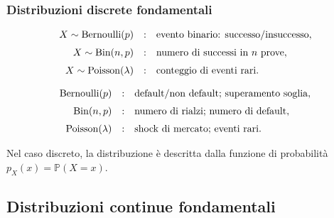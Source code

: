 \documentclass[handout]{beamer}%
\providecommand{\Prob}{\mathbb{P}}
\providecommand{\1}{\mathbf{1}}
\providecommand{\QTR}[2]{\csname #1\endcsname{#2}}
\begin{document}
\begin{frame}%
%

\frametitle{Distribuzioni discrete fondamentali}%
%

\[%
\begin{array}
[c]{rcl}%
X\sim\operatorname{Bernoulli}(p) & : &
\mbox{evento binario: successo/insuccesso},\\[6pt]%
X\sim\operatorname{Bin}(n,p) & : & \mbox{numero di successi in } n
\mbox{ prove},\\[6pt]%
X\sim\operatorname{Poisson}(\lambda) & : & \mbox{conteggio di eventi rari}.
\end{array}
\]


\medskip%

\[%
\begin{array}
[c]{rcl}%
\operatorname{Bernoulli}(p) & : &
\mbox{default/non default; superamento soglia},\\[6pt]%
\operatorname{Bin}(n,p) & : &
\mbox{numero di rialzi; numero di default},\\[6pt]%
\operatorname{Poisson}(\lambda) & : & \mbox{shock di mercato; eventi rari}.
\end{array}
\]


\medskip

Nel caso discreto, la distribuzione \`{e} descritta dalla funzione di
probabilit\`{a} $p_{X}(x)=\Prob(X=x)$.%

\transboxout
\end{frame}%




\subsection{Distribuzioni continue fondamentali}%
\end{document}
